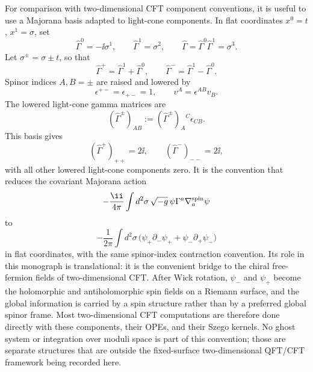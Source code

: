 \begin{definition}
\label{def:two-dimensional-chiral-component-majorana-convention}
For comparison with two-dimensional CFT component conventions, it is useful
to use a Majorana basis adapted to light-cone components.  In flat coordinates
\(x^0=t\), \(x^1=\sigma\), set
\[
  \widehat\Gamma^0=-\ii\sigma^1,\qquad
  \widehat\Gamma^1=\sigma^2,
  \qquad
  \widehat\Gamma=\widehat\Gamma^0\widehat\Gamma^1=\sigma^3 .
\]
Let \(\sigma^\pm=\sigma\pm t\), so that
\[
  \widehat\Gamma^+=\widehat\Gamma^1+\widehat\Gamma^0,
  \qquad
  \widehat\Gamma^-=\widehat\Gamma^1-\widehat\Gamma^0.
\]
Spinor indices \(A,B=\pm\) are raised and lowered by
\[
  \epsilon^{+-}=\epsilon_{+-}=1,\qquad
  v^A=\epsilon^{AB}v_B .
\]
The lowered light-cone gamma matrices are
\[
  (\widehat\Gamma^\pm)_{AB}
  :=
  (\widehat\Gamma^\pm)_A{}^C\epsilon_{CB}.
\]
This basis gives
\[
  (\widehat\Gamma^+)_{++}=2\ii,\qquad
  (\widehat\Gamma^-)_{--}=2\ii,
\]
with all other lowered light-cone components zero.  It is the convention that
reduces the covariant Majorana action
\[
  -\frac{\ii}{4\pi}
  \int d^2\sigma\,\sqrt{-g}\,
  \psi\Gamma^a\nabla_a^{\rm spin}\psi
\]
to
\[
  -\frac1{2\pi}\int d^2\sigma\,
  \bigl(\psi_+\partial_-\psi_+
  +\psi_-\partial_+\psi_-\bigr)
\]
in flat coordinates, with the same spinor-index contraction convention.  Its
role in this monograph is translational: it is the convenient bridge to the
chiral free-fermion fields of two-dimensional CFT.  After Wick rotation,
\(\psi_-\) and \(\psi_+\) become the holomorphic and antiholomorphic spin
fields on a Riemann surface, and the global information is carried by a spin
structure rather than by a preferred global spinor frame.  Most
two-dimensional CFT computations are therefore done directly with these
components, their OPEs, and their Szego kernels.  No ghost system or
integration over moduli space is part of this convention; those are separate
structures that are outside the fixed-surface two-dimensional QFT/CFT
framework being recorded here.
\end{definition}

